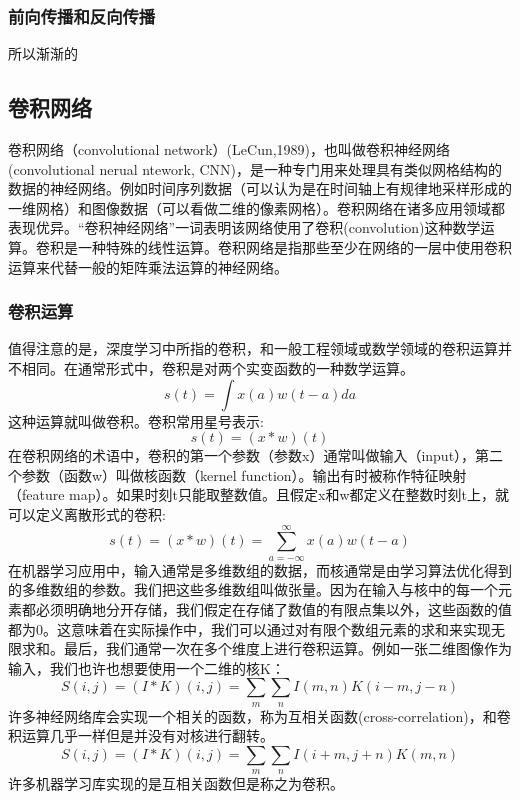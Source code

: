 \documentclass[12pt,a4paper,titlepage]{article}
\begin{document}
\subsubsection*{前向传播和反向传播}

所以渐渐的
\subsection*{卷积网络}
卷积网络（convolutional network）(LeCun,1989)，也叫做卷积神经网络(convolutional nerual ntework, CNN)，是一种专门用来处理具有类似网格结构的数据的神经网络。例如时间序列数据（可以认为是在时间轴上有规律地采样形成的一维网格）和图像数据（可以看做二维的像素网格）。卷积网络在诸多应用领域都表现优异。“卷积神经网络”一词表明该网络使用了卷积(convolution)这种数学运算。卷积是一种特殊的线性运算。卷积网络是指那些至少在网络的一层中使用卷积运算来代替一般的矩阵乘法运算的神经网络。
\subsubsection*{卷积运算}
值得注意的是，深度学习中所指的卷积，和一般工程领域或数学领域的卷积运算并不相同。在通常形式中，卷积是对两个实变函数的一种数学运算。
\[
s(t)=\int x(a)w(t-a)da
\]
这种运算就叫做卷积。卷积常用星号表示:
\[
s(t) = (x*w)(t)
\]
在卷积网络的术语中，卷积的第一个参数（参数x）通常叫做输入（input），第二个参数（函数w）叫做核函数（kernel function）。输出有时被称作特征映射（feature map）。如果时刻t只能取整数值。且假定x和w都定义在整数时刻t上，就可以定义离散形式的卷积:
\[
s(t) = (x*w)(t) = \sum_{a=-\infty}^{\infty}x(a)w(t-a)
\]
在机器学习应用中，输入通常是多维数组的数据，而核通常是由学习算法优化得到的多维数组的参数。我们把这些多维数组叫做张量。因为在输入与核中的每一个元素都必须明确地分开存储，我们假定在存储了数值的有限点集以外，这些函数的值都为0。这意味着在实际操作中，我们可以通过对有限个数组元素的求和来实现无限求和。最后，我们通常一次在多个维度上进行卷积运算。例如一张二维图像作为输入，我们也许也想要使用一个二维的核K：
\[
S(i,j) = (I*K)(i,j) = \sum_m\sum_nI(m,n)K(i-m,j-n)
\]
许多神经网络库会实现一个相关的函数，称为互相关函数(cross-correlation)，和卷积运算几乎一样但是并没有对核进行翻转。
\[
S(i,j) = (I*K)(i,j) = \sum_m\sum_nI(i+m,j+n)K(m,n)
\]
许多机器学习库实现的是互相关函数但是称之为卷积。
\end{document}
